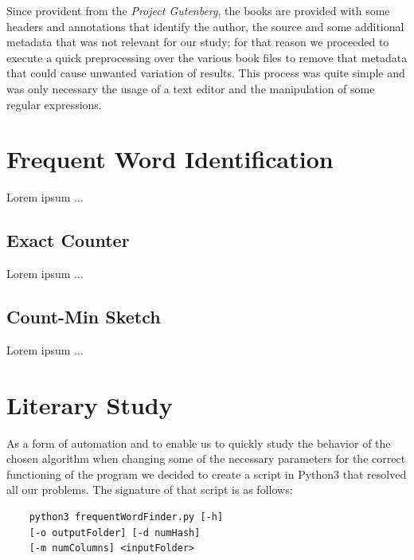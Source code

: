 \documentclass[shortpaper]{revdetua}
\begin{document}
Since provident from the \textit{Project Gutenberg}, the books are provided with some headers and annotations that identify the author, the source and some additional metadata that was not relevant for our study; for that reason we proceeded to execute a quick preprocessing over the various book files to remove that metadata that could cause unwanted variation of results. This process was quite simple and was only necessary the usage of a text editor and the manipulation of some regular expressions.


\section{Frequent Word Identification}\label{algs}

Lorem ipsum ...

\subsection{Exact Counter}

Lorem ipsum ...

\subsection{Count-Min Sketch}

Lorem ipsum ...


\section{Literary Study}

As a form of automation and to enable us to quickly study the behavior of the chosen algorithm when changing some of the necessary parameters for the correct functioning of the program we decided to create a script in Python3 that resolved all our problems. The signature of that script is as follows:

\begin{center}
    \begin{verbatim}
    python3 frequentWordFinder.py [-h] 
    [-o outputFolder] [-d numHash] 
    [-m numColumns] <inputFolder>
    \end{verbatim}
\end{center}
\end{document}
